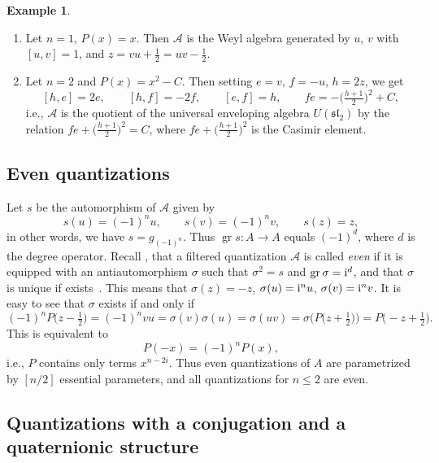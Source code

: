 \documentclass[10pt,a4paper]{amsart}
\newcommand{\gr}{\mathop{\mathrm{gr}}\nolimits}
\newcommand{\mc}[1]{\mathcal{#1}}
\theoremstyle{definition}
\newtheorem{Example}[Theorem]{Example}
\numberwithin{equation}{section}
\begin{document}
\begin{Example} \qquad
\begin{enumerate}\itemsep=0pt
\item[$1.$] Let $n=1$, $P(x)=x$. Then $\mc A$ is the Weyl algebra
generated by $u$, $v$ with $[u,v]=1$, and $z=vu+\tfrac{1}{2}=uv-\tfrac{1}{2}$.

\item[$2.$] Let $n=2$ and $P(x)=x^2-C$. Then setting $e=v$, $f=-u$, $h=2z$, we get
\[
[h,e]=2e,\qquad
[h,f]=-2f,\qquad
[e,f]=h,\qquad
fe=-\big(\tfrac{h+1}{2}\big)^2+C,
\]
i.e., $\mc A$ is the quotient of the universal enveloping algebra $U(\mathfrak{sl}_2)$ by the relation $fe+\big(\tfrac{h+1}{2}\big)^2=C$, where $fe+\big(\tfrac{h+1}{2}\big)^2$ is the Casimir element.
\end{enumerate}
\end{Example}

\subsection{Even quantizations}
Let $s$ be the automorphism of $\mc A$
given by
\[
s(u)=(-1)^nu,\qquad s(v)=(-1)^nv,\qquad s(z)=z,
\]
in other words, we have $s=g_{(-1)^n}$. Thus $\gr s\colon A\to A$
equals $(-1)^d$, where $d$ is the degree operator.
Recall \cite[Section~2.3]{ES}, that a filtered quantization $\mathcal{A}$ is called {\it even} if it is equipped with an antiautomorphism $\sigma$ such that $\sigma^2=s$ and $\gr\sigma={\rm i}^d$, and that $\sigma$ is unique if exists~\cite[Remark~2.10]{ES}. This means that $\sigma (z)=-z$, $\sigma (u)={\rm i}^n u$, $\sigma (v)={\rm i}^n v$. It is easy to see that $\sigma$ exists if and only if
\[
(-1)^n P\big(z-\tfrac{1}{2}\big)=(-1)^n vu=\sigma(v)\sigma(u)=\sigma (uv)=\sigma\big(P\big(z+\tfrac{1}{2}\big)\big)=P\big({-}z+\tfrac{1}{2}\big).
\]
This is equivalent to
\[
P(-x)=(-1)^n P(x),
\]
i.e., $P$ contains only terms $x^{n-2i}$. Thus even quantizations of $A$ are parametrized by $[n/2]$ essential parameters, and all quantizations for $n\le 2$ are even.

\subsection{Quantizations with a conjugation and a quaternionic structure}\label{conju}
\end{document}
